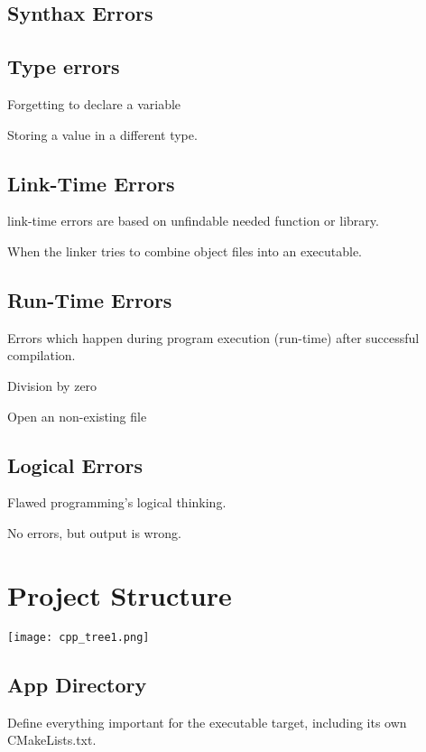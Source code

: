 \documentclass[openany]{report}
\begin{document}
\subsection{Synthax Errors}

\subsection{Type errors}

Forgetting to declare a variable

Storing a value in a different type. 

\subsection{Link-Time Errors}

link-time errors are based on unfindable needed function or library.

When the linker tries to combine object files into an executable.

\subsection{Run-Time Errors}

Errors which happen during program execution (run-time) after successful compilation.

Division by zero

Open an non-existing file

\subsection{Logical Errors}

Flawed programming's logical thinking. 

No errors, but output is wrong. 

\section{Project Structure}

\begin{center}
    \texttt{[image: cpp\_tree1.png]}
\end{center}

\subsection{App Directory}

Define everything important for the executable target, including its own CMakeLists.txt.
\end{document}
